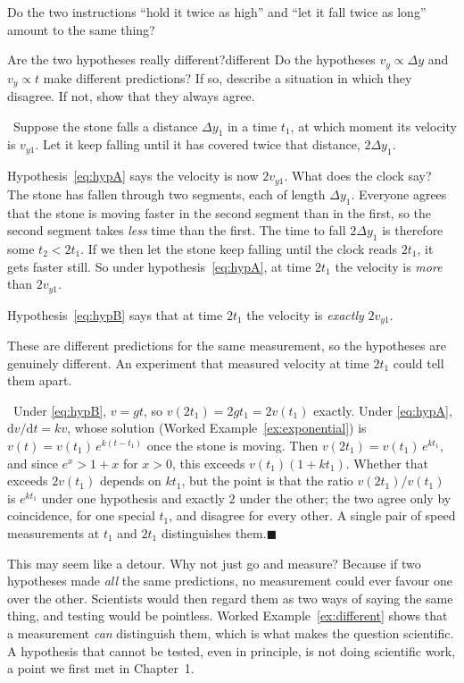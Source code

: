 \documentclass[11pt,twoside,openany]{book}
\newcommand{\dd}{\mathrm{d}}
\newcounter{check}[chapter]
\newcommand{\viewtag}[3]{\fcolorbox{#2}{#3}{\footnotesize\textbf{\textcolor{#2}{#1}}}}
\newcommand{\elemtag}{\viewtag{Elementary}{elemcol}{elempale}}
\newcommand{\calctag}{\viewtag{Calculus}{calccol}{calcpale}}
\newcommand{\elem}{\par\medskip\noindent\elemtag\ }
\newcommand{\calc}{\par\medskip\noindent\calctag\ }
\newcommand{\qed}{\hfill$\blacksquare$}
\begin{document}
Do the two instructions ``hold it twice as high'' and ``let it fall twice as long'' amount to the same thing?

\begin{example}{Are the two hypotheses really different?}{different}
Do the hypotheses $v_y \propto \Delta y$ and $v_y \propto t$ make different predictions? If so, describe a situation in which they disagree. If not, show that they always agree.

\elem Suppose the stone falls a distance $\Delta y_1$ in a time $t_1$, at which moment its velocity is $v_{y1}$. Let it keep falling until it has covered twice that distance, $2\Delta y_1$.

Hypothesis~\eqref{eq:hypA} says the velocity is now $2 v_{y1}$. What does the clock say? The stone has fallen through two segments, each of length $\Delta y_1$. Everyone agrees that the stone is moving faster in the second segment than in the first, so the second segment takes \emph{less} time than the first. The time to fall $2\Delta y_1$ is therefore some $t_2 < 2 t_1$. If we then let the stone keep falling until the clock reads $2t_1$, it gets faster still. So under hypothesis~\eqref{eq:hypA}, at time $2t_1$ the velocity is \emph{more} than $2 v_{y1}$.

Hypothesis~\eqref{eq:hypB} says that at time $2t_1$ the velocity is \emph{exactly} $2 v_{y1}$.

These are different predictions for the same measurement, so the hypotheses are genuinely different. An experiment that measured velocity at time $2t_1$ could tell them apart.

\calc Under \eqref{eq:hypB}, $v = gt$, so $v(2t_1) = 2g t_1 = 2v(t_1)$ exactly. Under \eqref{eq:hypA}, $\dd v/\dd t = kv$, whose solution (Worked Example~\ref{ex:exponential}) is $v(t) = v(t_1)\,e^{k(t - t_1)}$ once the stone is moving. Then $v(2t_1) = v(t_1)\,e^{k t_1}$, and since $e^{x} > 1 + x$ for $x > 0$, this exceeds $v(t_1)(1 + kt_1)$. Whether that exceeds $2v(t_1)$ depends on $kt_1$, but the point is that the ratio $v(2t_1)/v(t_1)$ is $e^{kt_1}$ under one hypothesis and exactly $2$ under the other; the two agree only by coincidence, for one special $t_1$, and disagree for every other. A single pair of speed measurements at $t_1$ and $2t_1$ distinguishes them.\qed
\end{example}

\begin{modelnote}
This may seem like a detour. Why not just go and measure? Because if two hypotheses made \emph{all} the same predictions, no measurement could ever favour one over the other. Scientists would then regard them as two ways of saying the same thing, and testing would be pointless. Worked Example~\ref{ex:different} shows that a measurement \emph{can} distinguish them, which is what makes the question scientific. A hypothesis that cannot be tested, even in principle, is not doing scientific work, a point we first met in Chapter~1.
\end{modelnote}
\end{document}

